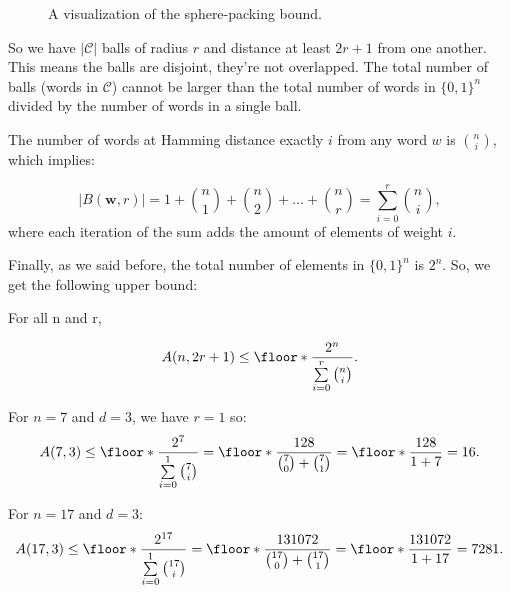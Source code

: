 \begin{figure}[ht!]
    \label{sphere-vis}
    \centering
\caption{A visualization of the sphere-packing bound.}
\end{figure}

So we have $|\mathcal{C}|$ balls of radius $r$ and distance at least $2r+1$ from one another. This means the balls are disjoint, they're not overlapped. The total number of balls (words in $\mathcal{C}$) cannot be larger than the total number of words in $\{0,1\}^n$  divided by the number of words in a single ball.

The number of words at Hamming distance exactly $i$ from any word $w$ is ${n \choose i}$, which implies:

\begin{equation}
    |B(\mathbf{w}, r)| = 1 + {n \choose 1} + {n \choose 2} + \dots + {n \choose r} = \sum_{i=0}^{r} {n \choose i},
\end{equation}
where each iteration of the sum adds the amount of elements of weight $i$.

Finally, as we said before, the total number of elements in $\{0,1\}^n$ is $2^n$. So, we get the following upper bound:

\begin{lemma}
    For all n and r,

    \begin{equation}
        A(n, 2r+1) \leq \floor*{\frac{2^n}{\sum\limits_{i=0}^{r}{n \choose i}}}.
    \end{equation}
\end{lemma}

\begin{example}
    For $n=7$ and $d=3$, we have $r=1$ so:
    \begin{equation}
        A(7,3) \leq \floor*{\frac{2^7}{\sum\limits_{i=0}^{1}{7 \choose i}}} = \floor*{\frac{128}{{7 \choose 0} + {7 \choose 1}}} = \floor*{\frac{128}{1 + 7}} = 16.
    \end{equation}
\end{example}

\begin{example}
    For $n=17$ and $d=3$:
    \begin{equation}
        A(17,3) \leq \floor*{\frac{2^{17}}{\sum\limits_{i=0}^{1}{17 \choose i}}} = \floor*{\frac{131072}{{17 \choose 0} + {17 \choose 1}}} = \floor*{\frac{131072}{1 + 17}} = 7281.
    \end{equation}
\end{example}

